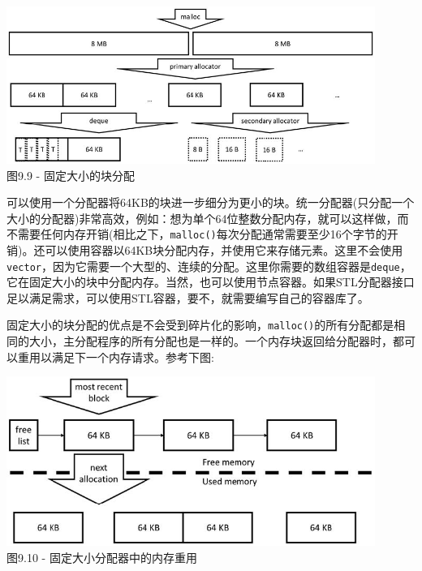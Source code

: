 \begin{center}
\includegraphics[width=0.9\textwidth]{content/3/chapter9/images/9.jpg}\\
图9.9 - 固定大小的块分配
\end{center}

可以使用一个分配器将64KB的块进一步细分为更小的块。统一分配器(只分配一个大小的分配器)非常高效，例如：想为单个64位整数分配内存，就可以这样做，而不需要任何内存开销(相比之下，\texttt{malloc()}每次分配通常需要至少16个字节的开销)。还可以使用容器以64KB块分配内存，并使用它来存储元素。这里不会使用\texttt{vector}，因为它需要一个大型的、连续的分配。这里你需要的数组容器是\texttt{deque}，它在固定大小的块中分配内存。当然，也可以使用节点容器。如果STL分配器接口足以满足需求，可以使用STL容器，要不，就需要编写自己的容器库了。

固定大小的块分配的优点是不会受到碎片化的影响，\texttt{malloc()}的所有分配都是相同的大小，主分配程序的所有分配也是一样的。一个内存块返回给分配器时，都可以重用以满足下一个内存请求。参考下图:

\begin{center}
\includegraphics[width=0.9\textwidth]{content/3/chapter9/images/10.jpg}\\
图9.10 - 固定大小分配器中的内存重用
\end{center}


